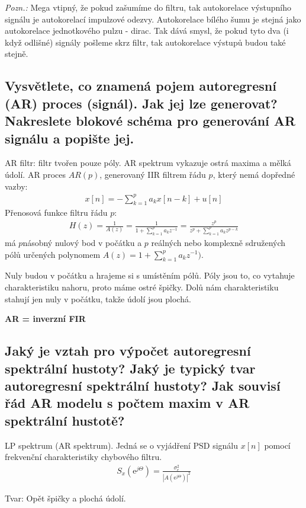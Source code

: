 \documentclass[a4paper,12pt]{article}   %
\newcommand{\mt}[1]{$#1$}
\newcommand{\ejt}{\text{e}^{j\Theta}}
\begin{document}
\textit{Pozn.:} Mega vtipný, že pokud zašumíme do filtru, tak autokorelace výstupního signálu je autokorelací impulzové odezvy. Autokorelace bílého šumu je stejná jako autokorelace jednotkového pulzu - dirac. Tak dává smysl, že pokud tyto dva (i když odlišné) signály pošleme skrz filtr, tak autokorelace výstupů budou také stejně.


\subsection{Vysvětlete, co znamená pojem autoregresní (AR) proces (signál). Jak jej lze generovat? Nakreslete blokové schéma pro generování AR signálu a popište jej.}
\label{sec:ar:intro}
AR filtr: filtr tvořen pouze póly. AR spektrum vykazuje ostrá maxima a mělká údolí. AR proces \mt{AR(p)}, generovaný IIR filtrem řádu \mt{p}, který nemá dopředné vazby:
\begin{align*}
        x[n]=-\sum_{k=1}^p a_k x[n-k] + u[n]
\end{align*}
Přenosová funkce filtru řádu \mt{p}:
\begin{align*}
        H(z) = \frac{1}{A(z)} = \frac{1}{1+\sum_{k=1}^p a_k z^{-1}} = \frac{z^p}{z^p + \sum_{k=1}^p a_k z^{p-k}}
\end{align*}
má \mt{p}násobný nulový bod v počátku a \mt{p} reálných nebo komplexně sdružených pólů určených polynomem \mt{A(z) = 1+\sum_{k=1}^p a_k z^{-1})}.

Nuly budou v počátku a hrajeme si s umístěním pólů. Póly jsou to, co vytahuje charakteristiku nahoru, proto máme ostré špičky. Dolů nám charakteristiku stahují jen nuly v počátku, takže údolí jsou plochá. 

\textbf{AR = inverzní FIR}


\subsection{Jaký je vztah pro výpočet autoregresní spektrální hustoty? Jaký je typický tvar autoregresní spektrální hustoty? Jak souvisí řád AR modelu s počtem maxim v AR spektrální hustotě?}

LP spektrum (AR spektrum). Jedná se o vyjádření PSD signálu \mt{x[n]} pomocí frekvenční charakteristiky chybového filtru. 
\begin{align*}
        S_x(\ejt) = \frac{\sigma^2_e}{|A(\ejt)|^2}
\end{align*}

Tvar: Opět špičky a plochá údolí.
\end{document}
